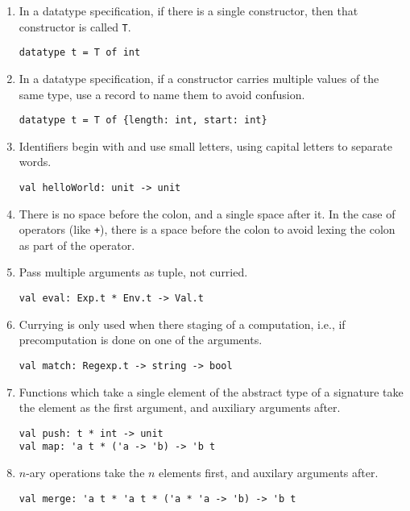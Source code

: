 \documentclass[12pt]{article}
\begin{document}
\begin{enumerate}

\item
In a datatype specification, if there is a single constructor, then that
constructor is called {\tt T}.
\begin{verbatim}
datatype t = T of int
\end{verbatim}

\item
In a datatype specification, if a constructor carries multiple values of the
same type, use a record to name them to avoid confusion.
\begin{verbatim}
datatype t = T of {length: int, start: int}
\end{verbatim}

\item
Identifiers begin with and use small letters, using capital letters to separate
words.
\begin{verbatim}
val helloWorld: unit -> unit
\end{verbatim}

\item
There is no space before the colon, and a single space after it.  In the case of
operators (like {\tt +}), there is a space before the colon to avoid lexing the
colon as part of the operator.

\item
Pass multiple arguments as tuple, not curried.
\begin{verbatim}
val eval: Exp.t * Env.t -> Val.t
\end{verbatim}

\item
Currying is only used when there staging of a computation, i.e., if
precomputation is done on one of the arguments.
\begin{verbatim}
val match: Regexp.t -> string -> bool
\end{verbatim}

\item
Functions which take a single element of the abstract type of a signature take
the element as the first argument, and auxiliary arguments after.
\begin{verbatim}
val push: t * int -> unit
val map: 'a t * ('a -> 'b) -> 'b t
\end{verbatim}

\item
$n$-ary operations take the $n$ elements first, and auxilary arguments after.
\begin{verbatim}
val merge: 'a t * 'a t * ('a * 'a -> 'b) -> 'b t
\end{verbatim}


\end{enumerate}
\end{document}
